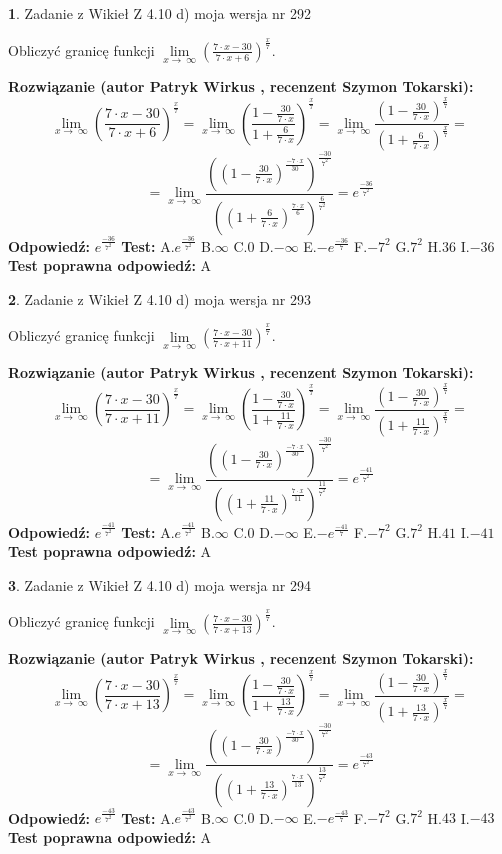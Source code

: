 \documentclass[12pt, a4paper]{article}
\theoremstyle{definition} %
\newtheorem{zad}{}
\newcommand{\zadStart}[1]{\begin{zad}#1\newline}
\newcommand{\zadStop}{\end{zad}}
\newcommand{\rozwStart}[2]{\noindent \textbf{Rozwiązanie (autor #1 , recenzent #2): }\newline}
\newcommand{\rozwStop}{\newline}
\newcommand{\odpStart}{\noindent \textbf{Odpowiedź:}\newline}
\newcommand{\odpStop}{\newline}
\newcommand{\testStart}{\noindent \textbf{Test:}\newline}
\newcommand{\testStop}{\newline}
\newcommand{\kluczStart}{\noindent \textbf{Test poprawna odpowiedź:}\newline}
\newcommand{\kluczStop}{\newline}
\begin{document}
\zadStart{Zadanie z Wikieł Z 4.10 d) moja wersja nr 292}


Obliczyć granicę funkcji  $\lim\limits_{x\to\ \infty}(\frac{7\cdot x-30}{7\cdot x+6})^{\frac{x}{7}}$.
\zadStop
\rozwStart{Patryk Wirkus}{Szymon Tokarski}
$$\lim\limits_{x\to\ \infty}(\frac{7\cdot x-30}{7\cdot x+6})^{\frac{x}{7}} = \lim\limits_{x\to\ \infty}(\frac{1-\frac{30}{7\cdot x}}{1+\frac{6}{7\cdot x}})^{\frac{x}{7}}=\lim\limits_{x\to\ \infty}\frac{(1-\frac{30}{7\cdot x})^{\frac{x}{7}}}{(1+\frac{6}{7\cdot x})^{\frac{x}{7}}}=$$
$$=\lim\limits_{x\to\ \infty}\frac{((1-\frac{30}{7\cdot x})^{\frac{-7\cdot x}{30}})^{\frac{-30}{7^{2}}}}{((1+\frac{6}{7\cdot x})^{\frac{7\cdot x}{6}})^{\frac{6}{7^{2}}}}=e^{\frac{-36}{7^{2}}}$$
\rozwStop
\odpStart
$e^{\frac{-36}{7^{2}}}$
\odpStop
\testStart
A.$e^{\frac{-36}{7^{2}}}$ B.$\infty$ C.$0$ D.$-\infty$ E.$-e^{\frac{-36}{7}}$
F.$-7^{2}$ G.$7^{2}$
H.$36$
I.$-36$
\testStop
\kluczStart
A
\kluczStop



\zadStart{Zadanie z Wikieł Z 4.10 d) moja wersja nr 293}


Obliczyć granicę funkcji  $\lim\limits_{x\to\ \infty}(\frac{7\cdot x-30}{7\cdot x+11})^{\frac{x}{7}}$.
\zadStop
\rozwStart{Patryk Wirkus}{Szymon Tokarski}
$$\lim\limits_{x\to\ \infty}(\frac{7\cdot x-30}{7\cdot x+11})^{\frac{x}{7}} = \lim\limits_{x\to\ \infty}(\frac{1-\frac{30}{7\cdot x}}{1+\frac{11}{7\cdot x}})^{\frac{x}{7}}=\lim\limits_{x\to\ \infty}\frac{(1-\frac{30}{7\cdot x})^{\frac{x}{7}}}{(1+\frac{11}{7\cdot x})^{\frac{x}{7}}}=$$
$$=\lim\limits_{x\to\ \infty}\frac{((1-\frac{30}{7\cdot x})^{\frac{-7\cdot x}{30}})^{\frac{-30}{7^{2}}}}{((1+\frac{11}{7\cdot x})^{\frac{7\cdot x}{11}})^{\frac{11}{7^{2}}}}=e^{\frac{-41}{7^{2}}}$$
\rozwStop
\odpStart
$e^{\frac{-41}{7^{2}}}$
\odpStop
\testStart
A.$e^{\frac{-41}{7^{2}}}$ B.$\infty$ C.$0$ D.$-\infty$ E.$-e^{\frac{-41}{7}}$
F.$-7^{2}$ G.$7^{2}$
H.$41$
I.$-41$
\testStop
\kluczStart
A
\kluczStop



\zadStart{Zadanie z Wikieł Z 4.10 d) moja wersja nr 294}


Obliczyć granicę funkcji  $\lim\limits_{x\to\ \infty}(\frac{7\cdot x-30}{7\cdot x+13})^{\frac{x}{7}}$.
\zadStop
\rozwStart{Patryk Wirkus}{Szymon Tokarski}
$$\lim\limits_{x\to\ \infty}(\frac{7\cdot x-30}{7\cdot x+13})^{\frac{x}{7}} = \lim\limits_{x\to\ \infty}(\frac{1-\frac{30}{7\cdot x}}{1+\frac{13}{7\cdot x}})^{\frac{x}{7}}=\lim\limits_{x\to\ \infty}\frac{(1-\frac{30}{7\cdot x})^{\frac{x}{7}}}{(1+\frac{13}{7\cdot x})^{\frac{x}{7}}}=$$
$$=\lim\limits_{x\to\ \infty}\frac{((1-\frac{30}{7\cdot x})^{\frac{-7\cdot x}{30}})^{\frac{-30}{7^{2}}}}{((1+\frac{13}{7\cdot x})^{\frac{7\cdot x}{13}})^{\frac{13}{7^{2}}}}=e^{\frac{-43}{7^{2}}}$$
\rozwStop
\odpStart
$e^{\frac{-43}{7^{2}}}$
\odpStop
\testStart
A.$e^{\frac{-43}{7^{2}}}$ B.$\infty$ C.$0$ D.$-\infty$ E.$-e^{\frac{-43}{7}}$
F.$-7^{2}$ G.$7^{2}$
H.$43$
I.$-43$
\testStop
\kluczStart
A
\kluczStop
\end{document}
